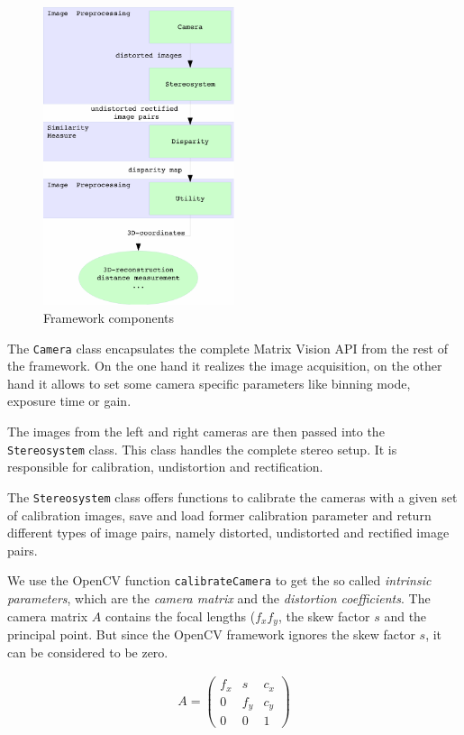 \documentclass[11pt]{article}
\begin{document}
\begin{figure}[H]
        \centering
        \includegraphics[width=0.5\textwidth]{images/graph_composition}
        \caption{Framework components}
        \label{fig:framework}
\end{figure}

The \texttt{Camera} class encapsulates the complete Matrix Vision API from the rest of the framework. On the one hand it realizes the image acquisition, on the other hand it allows to set some camera specific parameters like binning mode, exposure time or gain.

The images from the left and right cameras are then passed into the \texttt{Stereosystem} class. This class handles the complete stereo setup. It is responsible for calibration, undistortion and rectification. 

The \texttt{Stereosystem} class offers functions to calibrate the cameras with a given set of calibration images, save and load former calibration parameter and return different types of image pairs, namely distorted, undistorted and rectified image pairs.

We use the OpenCV function \texttt{calibrateCamera} to get the so called  \emph{intrinsic parameters}, which are the \emph{camera matrix} and the \emph{distortion coefficients}. The camera matrix $A$ contains the focal lengths ($f_x$$f_y$, the skew factor $s$ and the principal point. But since the OpenCV framework ignores the skew factor $s$, it can be considered to be zero.

\begin{align*}
A=
\begin{pmatrix}
f_x & s & c_x\\
0 & f_y & c_y\\
0 & 0 & 1
\end{pmatrix}
\end{align*}
\end{document}
